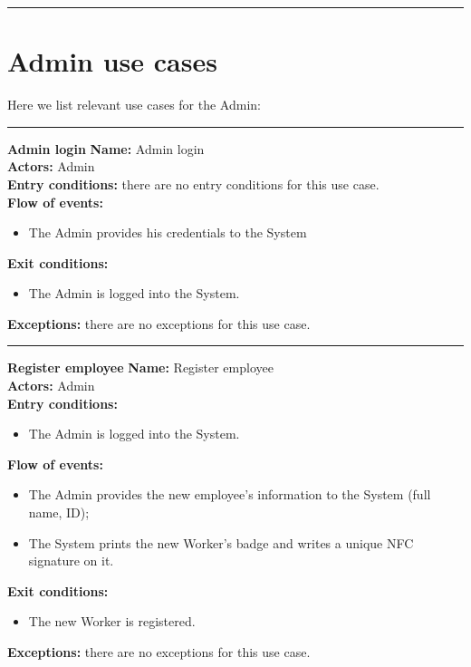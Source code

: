 \begin{center}
\noindent\rule{8cm}{1.0pt}
\end{center}

\newpage
\section{Admin use cases}
Here we list relevant use cases for the Admin:\\
\begin{center}
\noindent\rule{8cm}{1.0pt}
\end{center}


\textbf{\large Admin login}
\bigbreak
\textbf{Name:} Admin login \\
\textbf{Actors:} Admin \\
\textbf{Entry conditions:} there are no entry conditions for this use case.\\
\textbf{Flow of events:} 
\begin{itemize}
\item The Admin provides his credentials to the System  
\end{itemize}
\textbf{Exit conditions:} 
\begin{itemize}
\item The Admin is logged into the System.
\end{itemize}
\textbf{Exceptions:} there are no exceptions for this use case.\\


\begin{center}
\noindent\rule{8cm}{1.0pt}
\end{center}


\textbf{\large Register employee}
\bigbreak
\textbf{Name:} Register employee \\
\textbf{Actors:} Admin \\
\textbf{Entry conditions:} 
\begin{itemize}
\item The Admin is logged into the System.
\end{itemize}
\textbf{Flow of events:} 
\begin{itemize}
\item The Admin provides the new employee's information to the System (full name, ID);
 \item The System prints the new Worker's badge and writes a unique NFC signature on it.
\end{itemize}
\textbf{Exit conditions:} 
\begin{itemize}
\item The new Worker is registered.
\end{itemize}
\textbf{Exceptions:} there are no exceptions for this use case.\\


